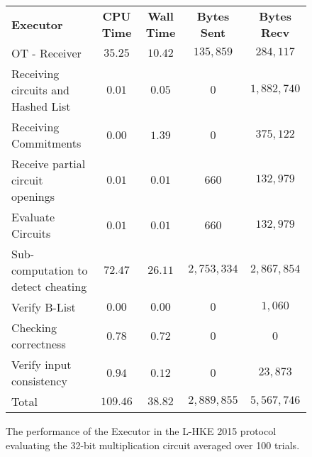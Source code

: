 \documentclass[ %
                    author={Nicholas Tutte},
                supervisor={Prof. Nigel Smart},
                    degree={MEng},
                     title={Secure Two Party Computation},
                  subtitle={A practical comparison of recent protocols},
                      type={Research - GG1K},
                      year={2015} ]{dissertation}
\begin{document}
				\begin{figure}[!ht]
					\begin{tabular}{| p{4.3cm} | c c c c |}
						\hline
						\textbf{Executor} & \textbf{CPU Time} & \textbf{Wall Time} & \textbf{Bytes Sent} & \textbf{Bytes Recv} \\
						\thickhline
						OT - Receiver & $35.25$ & $10.42$ & $135,859$ & $284,117$ \\
						\hline
						Receiving circuits and Hashed List & $0.01$ & $0.05$ & $0$ & $1,882,740$ \\
						\hline
						Receiving Commitments & $0.00$ & $1.39$ & $0$ & $375,122$ \\
						\hline
						Receive partial circuit openings & $0.01$ & $0.01$ & $660$ & $132,979$ \\
						\hline
						Evaluate Circuits & $0.01$ & $0.01$ & $660$ & $132,979$ \\
						\hline
						Sub-computation to detect cheating & $72.47$ & $26.11$ & $2,753,334$ & $2,867,854$ \\
						\hline
						Verify B-List & $0.00$ & $0.00$ & $0$ & $1,060$ \\
						\hline
						Checking correctness & $0.78$ & $0.72$ & $0$ & $0$ \\
						\hline
						Verify input consistency & $0.94$ & $0.12$ & $0$ & $23,873$ \\
						\thickhline
						Total & $109.46$ & $38.82$ & $2,889,855$ & $5,567,746$ \\
						\hline
					\end{tabular}
					\caption{The performance of the Executor in the L-HKE 2015 protocol evaluating the 32-bit multiplication circuit averaged over 100 trials. \label{table:L-HKE_2015_Mul_Executor}}
				\end{figure}
\end{document}

